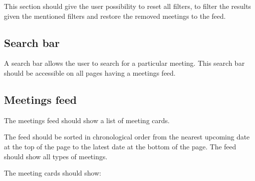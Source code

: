 \documentclass[conference]{IEEEtran}
\begin{document}
This section should give the user possibility to reset all filters, to filter the results given the mentioned filters and restore the removed meetings to the feed.

\subsection{Search bar}

A search bar allows the user to search for a particular meeting. This search bar should be accessible on all pages having a meetings feed.

\subsection{Meetings feed}

The meetings feed should show a list of meeting cards. 

The feed should be sorted in chronological order from the nearest upcoming date at the top of the page to the latest date at the bottom of the page. The feed should show all types of meetings.

The meeting cards should show:
\end{document}
